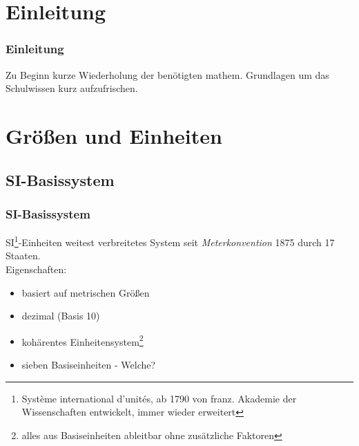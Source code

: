 

\subtitle{Technik Klasse E 01: \\
          Mathematische Grundlagen und Einheiten \\[2em]}
\date{Stand 30.10.2014}


\section{Einleitung}

\begin{frame}
    \frametitle{Einleitung}

    Zu Beginn kurze Wiederholung der benötigten mathem. Grundlagen um das
    Schulwissen kurz aufzufrischen.

\end{frame}

\section{Größen und Einheiten}

\subsection{SI-Basissystem}

\begin{frame}
    \frametitle{SI-Basissystem}

    SI\footnote{Système international d’unités, ab 1790 von franz. Akademie der
    Wissenschaften entwickelt, immer wieder erweitert}-Einheiten weitest
    verbreitetes System seit \emph{Meterkonvention} 1875 durch 17 Staaten.
    \\[1em]

    Eigenschaften:

    \begin{itemize}
        \item basiert auf metrischen Größen
        \item dezimal (Basis 10)
        \item kohärentes Einheitensystem\footnote{alles aus Basiseinheiten
              ableitbar ohne zusätzliche Faktoren}
        \item sieben Basiseinheiten - Welche?
    \end{itemize}

\end{frame}

